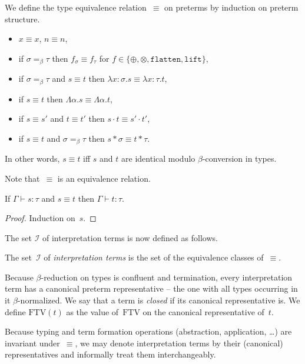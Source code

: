 \documentclass[runningheads,a4paper]{llncs}
\newcommand{\Iterms}{\mathcal{I}}
\newcommand{\abs}[2]{\lambda #1.#2}
\newcommand{\tabs}[2]{\Lambda #1.#2}
\newcommand{\tapp}[2]{#1 * #2}
\newcommand{\FTV}{\mathrm{FTV}}
\newcommand{\flatten}{\mathtt{flatten}}
\newcommand{\lift}{\mathtt{lift}}
\begin{document}
\begin{definition}
  We define the type equivalence relation~$\equiv$ on preterms by
  induction on preterm structure.
  \begin{itemize}
  \item $x \equiv x$, $n \equiv n$,
  \item if $\sigma =_\beta \tau$ then $f_\sigma \equiv f_\tau$ for $f
    \in \{\oplus,\otimes,\flatten,\lift\}$,
  \item if $\sigma =_\beta \tau$ and $s \equiv t$ then
    $\abs{x:\sigma}{s} \equiv \abs{x:\tau}{t}$,
  \item if $s \equiv t$ then $\tabs{\alpha}{s} \equiv
    \tabs{\alpha}{t}$,
  \item if $s \equiv s'$ and $t \equiv t'$ then $s \cdot t \equiv s'
    \cdot t'$,
  \item if $s \equiv t$ and $\sigma =_\beta \tau$ then
    $\tapp{s}{\sigma} \equiv \tapp{t}{\tau}$.
  \end{itemize}
  In other words, $s \equiv t$ iff $s$ and $t$ are identical modulo
  $\beta$-conversion in types.
\end{definition}

Note that~$\equiv$ is an equivalence relation.

\begin{lemma}
  If $\Gamma \vdash s : \tau$ and $s \equiv t$ then $\Gamma \vdash t :
  \tau$.
\end{lemma}

\begin{proof}
  Induction on~$s$.
\end{proof}

The set $\Iterms$ of interpretation terms is now defined as follows.

\begin{definition}\normalfont
  The set~$\Iterms$ of \emph{interpretation terms} is the set of the
  equivalence classes of~$\equiv$.
\end{definition}

Because $\beta$-reduction on types is confluent and termination, every
interpretation term has a canonical preterm representative -- the one
with all types occurring in it $\beta$-normalized. We say that a term
is \emph{closed} if its canonical representative is. We define
$\FTV(t)$ as the value of~$\FTV$ on the canonical representative
of~$t$.

Because typing and term formation operations (abstraction,
application, \ldots) are invariant under~$\equiv$, we may denote
interpretation terms by their (canonical) representatives and
informally treat them interchangeably.
\end{document}
